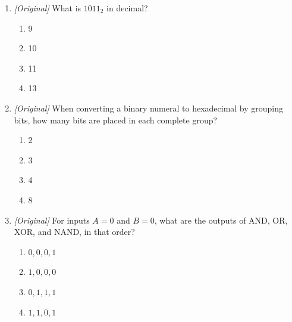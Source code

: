 \documentclass[11pt]{article}
\begin{document}
\begin{enumerate}[label=\textbf{Q\arabic*.}, leftmargin=*]
\begin{enumerate}[label=\Alph*.]
    \item II and III only
    \item I, II, and III
  \end{enumerate}
\item \textit{[Original]} What is $1011_2$ in decimal?
  \begin{enumerate}[label=\Alph*.]
    \item 9
    \item 10
    \item 11
    \item 13
  \end{enumerate}
\item \textit{[Original]} When converting a binary numeral to hexadecimal by
  grouping bits, how many bits are placed in each complete group?
  \begin{enumerate}[label=\Alph*.]
    \item 2
    \item 3
    \item 4
    \item 8
  \end{enumerate}
\item \textit{[Original]} For inputs $A=0$ and $B=0$, what are the outputs
  of AND, OR, XOR, and NAND, in that order?
  \begin{enumerate}[label=\Alph*.]
    \item $0,0,0,1$
    \item $1,0,0,0$
    \item $0,1,1,1$
    \item $1,1,0,1$
  \end{enumerate}


\end{enumerate}
\end{document}
